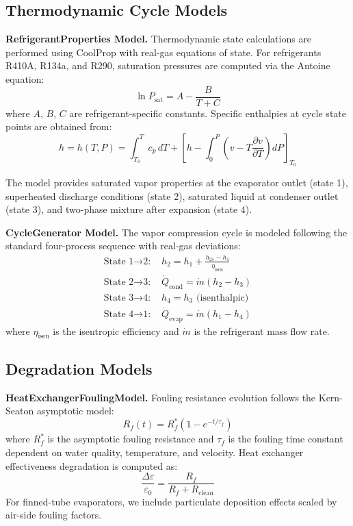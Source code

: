 \documentclass[11pt]{article}
\begin{document}
\subsection{Thermodynamic Cycle Models}

\textbf{RefrigerantProperties Model.} Thermodynamic state calculations are performed using CoolProp with real-gas equations of state. For refrigerants R410A, R134a, and R290, saturation pressures are computed via the Antoine equation:
\begin{equation}
\ln P_{\text{sat}} = A - \frac{B}{T + C}
\end{equation}
where $A$, $B$, $C$ are refrigerant-specific constants. Specific enthalpies at cycle state points are obtained from:
\begin{equation}
h = h(T, P) = \int_{T_0}^{T} c_p \, dT + \left[ h - \int_0^P \left( v - T \frac{\partial v}{\partial T} \right) dP \right]_{T_0}
\end{equation}

The model provides saturated vapor properties at the evaporator outlet (state 1), superheated discharge conditions (state 2), saturated liquid at condenser outlet (state 3), and two-phase mixture after expansion (state 4).

\textbf{CycleGenerator Model.} The vapor compression cycle is modeled following the standard four-process sequence with real-gas deviations:
\begin{align}
\text{State 1$\rightarrow$2: } & h_2 = h_1 + \frac{h_{2s} - h_1}{\eta_{\text{isen}}} \\
\text{State 2$\rightarrow$3: } & \dot{Q}_{\text{cond}} = \dot{m}(h_2 - h_3) \\
\text{State 3$\rightarrow$4: } & h_4 = h_3 \text{ (isenthalpic)} \\
\text{State 4$\rightarrow$1: } & \dot{Q}_{\text{evap}} = \dot{m}(h_1 - h_4)
\end{align}
where $\eta_{\text{isen}}$ is the isentropic efficiency and $\dot{m}$ is the refrigerant mass flow rate.

\subsection{Degradation Models}

\textbf{HeatExchangerFoulingModel.} Fouling resistance evolution follows the Kern-Seaton asymptotic model:
\begin{equation}
R_f(t) = R_f^* \left(1 - e^{-t/\tau_f}\right)
\end{equation}
where $R_f^*$ is the asymptotic fouling resistance and $\tau_f$ is the fouling time constant dependent on water quality, temperature, and velocity. Heat exchanger effectiveness degradation is computed as:
\begin{equation}
\frac{\Delta \varepsilon}{\varepsilon_0} = \frac{R_f}{R_f + R_{\text{clean}}}
\end{equation}
For finned-tube evaporators, we include particulate deposition effects scaled by air-side fouling factors.
\end{document}

